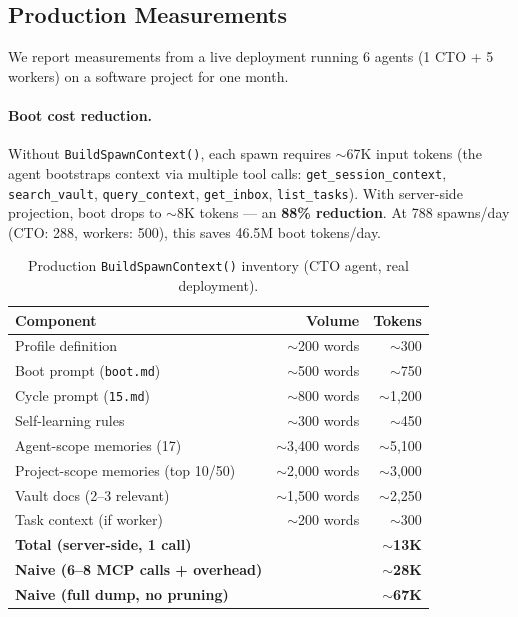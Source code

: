 \documentclass{article}
\begin{document}
\subsection{Production Measurements}

We report measurements from a live deployment running 6 agents (1 CTO + 5 workers) on a software project for one month.

\paragraph{Boot cost reduction.} Without \texttt{BuildSpawnContext()}, each spawn requires $\sim$67K input tokens (the agent bootstraps context via multiple tool calls: \texttt{get\_session\_context}, \texttt{search\_vault}, \texttt{query\_context}, \texttt{get\_inbox}, \texttt{list\_tasks}). With server-side projection, boot drops to $\sim$8K tokens --- an \textbf{88\% reduction}. At 788 spawns/day (CTO: 288, workers: 500), this saves 46.5M boot tokens/day.

\begin{table}[h]
\centering
\caption{Production \texttt{BuildSpawnContext()} inventory (CTO agent, real deployment).}
\begin{tabular}{@{}lrr@{}}
\toprule
\textbf{Component} & \textbf{Volume} & \textbf{Tokens} \\
\midrule
Profile definition & $\sim$200 words & $\sim$300 \\
Boot prompt (\texttt{boot.md}) & $\sim$500 words & $\sim$750 \\
Cycle prompt (\texttt{15.md}) & $\sim$800 words & $\sim$1,200 \\
Self-learning rules & $\sim$300 words & $\sim$450 \\
Agent-scope memories (17) & $\sim$3,400 words & $\sim$5,100 \\
Project-scope memories (top 10/50) & $\sim$2,000 words & $\sim$3,000 \\
Vault docs (2--3 relevant) & $\sim$1,500 words & $\sim$2,250 \\
Task context (if worker) & $\sim$200 words & $\sim$300 \\
\midrule
\textbf{Total (server-side, 1 call)} & & \textbf{$\sim$13K} \\
\textbf{Naive (6--8 MCP calls + overhead)} & & \textbf{$\sim$28K} \\
\textbf{Naive (full dump, no pruning)} & & \textbf{$\sim$67K} \\
\bottomrule
\end{tabular}
\label{tab:boot}
\end{table}
\end{document}
